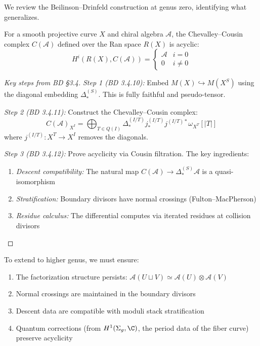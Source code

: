We review the Beilinson--Drinfeld construction at genus zero, identifying what generalizes.

\begin{theorem}\label{thm:BD-genus-zero}
For a smooth projective curve $X$ and chiral algebra $\mathcal{A}$, the Chevalley--Cousin complex $C(\mathcal{A})$ defined over the Ran space $R(X)$ is acyclic:
\[H^i(R(X), C(\mathcal{A})) = 
\begin{cases}
\mathcal{A} & i = 0 \\
0 & i \neq 0
\end{cases}\]
\end{theorem}

\begin{proof}[Key steps from BD §3.4]
\emph{Step 1 (BD 3.4.10):} Embed $M(X) \hookrightarrow M(X^S)$ using the diagonal embedding $\Delta^{(S)}_*$. This is fully faithful and pseudo-tensor.

\emph{Step 2 (BD 3.4.11):} Construct the Chevalley--Cousin complex:
\[C(\mathcal{A})_{X^I} = \bigoplus_{T \in Q(I)} \Delta^{(I/T)}_* j^{(I/T)}_* j^{(I/T)*} \omega_{X^T}[|T|]\]
where $j^{(I/T)}: X^T \to X^I$ removes the diagonals.

\emph{Step 3 (BD 3.4.12):} Prove acyclicity via Cousin filtration. The key ingredients:
\begin{enumerate}
\item \emph{Descent compatibility:} The natural map $C(\mathcal{A}) \to \Delta^{(S)}_* \mathcal{A}$ is a quasi-isomorphism
\item \emph{Stratification:} Boundary divisors have normal crossings (Fulton--MacPherson)
\item \emph{Residue calculus:} The differential computes via iterated residues at collision divisors
\end{enumerate}
\end{proof}

\begin{remark}\label{rem:what-to-preserve}
To extend to higher genus, we must ensure:
\begin{enumerate}
\item The factorization structure persists: $\mathcal{A}(U \sqcup V) \simeq \mathcal{A}(U) \otimes \mathcal{A}(V)$
\item Normal crossings are maintained in the boundary divisors
\item Descent data are compatible with moduli stack stratification
\item Quantum corrections (from $H^1(\Sigma_g, \C)$, the period data of the fiber curve) preserve acyclicity
\end{enumerate}
\end{remark}

